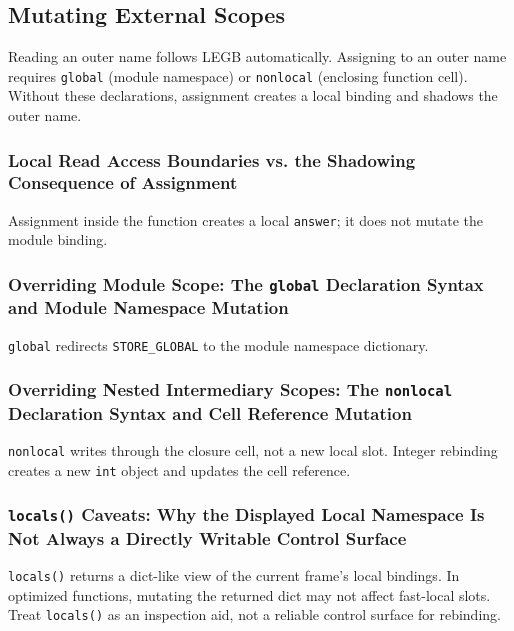 \subsection{Mutating External Scopes}

Reading an outer name follows LEGB automatically. Assigning to an outer name requires \texttt{global} (module namespace) or \texttt{nonlocal} (enclosing function cell). Without these declarations, assignment creates a local binding and shadows the outer name.

\subsubsection{Local Read Access Boundaries vs. the Shadowing Consequence of Assignment}



Assignment inside the function creates a local \texttt{answer}; it does not mutate the module binding.

\subsubsection{Overriding Module Scope: The \texttt{global} Declaration Syntax and Module Namespace Mutation}



\texttt{global} redirects \texttt{STORE\_GLOBAL} to the module namespace dictionary.

\subsubsection{Overriding Nested Intermediary Scopes: The \texttt{nonlocal} Declaration Syntax and Cell Reference Mutation}



\texttt{nonlocal} writes through the closure cell, not a new local slot. Integer rebinding creates a new \texttt{int} object and updates the cell reference.

\subsubsection{\texttt{locals()} Caveats: Why the Displayed Local Namespace Is Not Always a Directly Writable Control Surface}

\texttt{locals()} returns a dict-like view of the current frame's local bindings. In optimized functions, mutating the returned dict may not affect fast-local slots. Treat \texttt{locals()} as an inspection aid, not a reliable control surface for rebinding.
